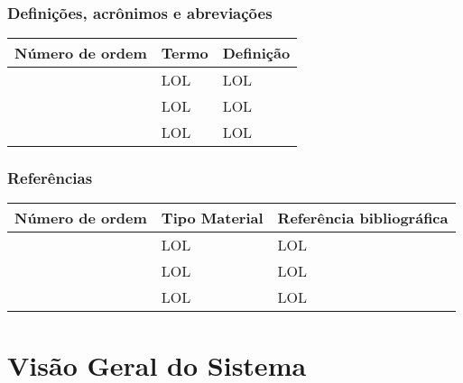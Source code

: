 \documentclass[12pt,a4paper]{article}
\begin{document}
        	
        	\subsubsection{Definições, acrônimos e abreviações}
        	        	\begin{table}[h]
        		        	\noindent\begin{tabular}{|p{}|p{}|p{}|}
        		        		\hline
        		        		\setcounter{Number}{0}
        		        		\textbf{Número de ordem} & \textbf{Termo} & \textbf{Definição} \\
        		        		\hline
        		        		\Item & LOL & LOL \\
        		        		\hline
        		        		\Item & LOL & LOL \\
        		        		\hline
        		        		\Item & LOL & LOL \\
        		        		\hline
        		        	\end{tabular}
        	        	\end{table}
        	        	
        	\subsubsection{Referências}
        	        	\begin{table}[!h]
        		        	\noindent\begin{tabular}{|p{}|p{}|p{}|}
        		        		\hline
        		        		\setcounter{Number}{0}
        		        		\textbf{Número de ordem} & \textbf{Tipo Material} & \textbf{Referência bibliográfica} \\
        		        		\hline
        		        		\Item & LOL & LOL \\
        		        		\hline
        		        		\Item & LOL & LOL \\
        		        		\hline
        		        		\Item & LOL & LOL \\
        		        		\hline
        		        	\end{tabular}
        	        	\end{table}	
        \clearpage
        \section{Visão Geral do Sistema}
        
\end{document}
